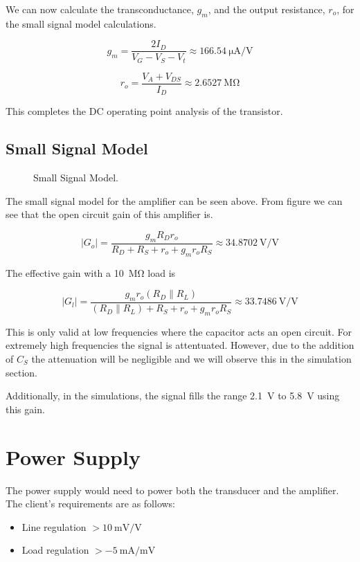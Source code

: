 \documentclass[journal]{IEEEtran}
\begin{document}
We can now calculate the transconductance, $g_m$, and the output resistance, $r_o$, for the small signal model calculations.

$$ g_m = \frac{2 I_D}{V_G - V_S - V_t} \approx \SI{166.54}{\micro\ampere\per\volt} $$

$$ r_o = \frac{V_A + V_{DS}}{I_D} \approx \SI{2.6527}{\mega\ohm} $$

This completes the DC operating point analysis of the transistor.

\subsection{Small Signal Model}

\begin{figure}[H]
	\centering
	
	\caption{Small Signal Model.}
	\label{ss}
\end{figure}

The small signal model for the amplifier can be seen above. From figure we can see that the open circuit gain of this amplifier is.

$$ |G_o| = \frac{g_m R_D r_o}{R_D + R_S + r_o + g_m r_o R_S} \approx \SI{34.8702}{\volt\per\volt}$$

The effective gain with a \SI{10}{\mega\ohm} load is

$$ |G_l| = \frac{g_m r_o \left( R_D \mathbin{\|} R_L \right)}{\left( R_D \mathbin{\|} R_L \right) + R_S + r_o + g_m r_o R_S} \approx \SI{33.7486}{\volt\per\volt} $$

This is only valid at low frequencies where the capacitor acts an open circuit. For extremely high frequencies the signal is attentuated. However, due to the addition of $C_S$ the attenuation will be negligible and we will observe this in the simulation section.

Additionally, in the simulations, the signal fills the range \SI{2.1}{\volt} to \SI{5.8}{\volt} using this gain.

\section{Power Supply}
The power supply would need to power both the transducer and the amplifier. The client's requirements are as follows:
\begin{itemize}
\item Line regulation $> \SI[per-mode=symbol]{10}{\milli\volt\per\volt}$
\item Load regulation $> \SI[per-mode=symbol]{-5}{\milli\ampere\per\milli\volt}$
\end{itemize}
\end{document}
